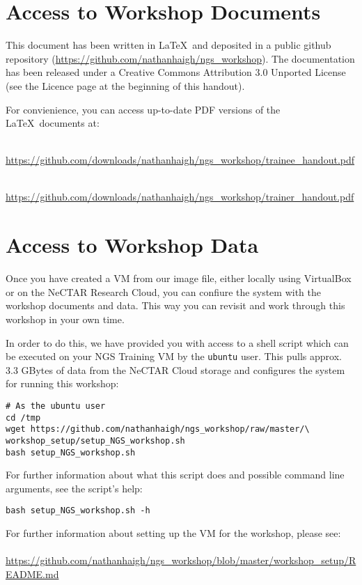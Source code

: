 \section{Access to Workshop Documents}

This document has been written in \LaTeX\ and deposited in a public github
repository (\url{https://github.com/nathanhaigh/ngs_workshop}). The
documentation has been released under a Creative Commons Attribution 3.0
Unported License (see the Licence page at the beginning of this handout).

For convienience, you can access up-to-date PDF versions of the \LaTeX\ documents at:
\begin{description}[style=multiline,labelindent=0cm,align=left,leftmargin=0.5cm]
\item[Trainee Handout]\hfill\\
\url{https://github.com/downloads/nathanhaigh/ngs_workshop/trainee_handout.pdf}
\item[Trainer Handout]\hfill\\
\url{https://github.com/downloads/nathanhaigh/ngs_workshop/trainer_handout.pdf}
\end{description}

\section{Access to Workshop Data}
Once you have created a VM from our image file, either locally using VirtualBox
or on the NeCTAR Research Cloud, you can confiure the system with the workshop
documents and data. This way you can revisit and work through this workshop in
your own time.

In order to do this, we have provided you with access to a shell script which
can be executed on your NGS Training VM by the \texttt{ubuntu} user. This pulls
approx. 3.3 GBytes of data from the NeCTAR Cloud storage and configures the system
for running this workshop:

\begin{lstlisting}
# As the ubuntu user
cd /tmp
wget https://github.com/nathanhaigh/ngs_workshop/raw/master/\
workshop_setup/setup_NGS_workshop.sh
bash setup_NGS_workshop.sh
\end{lstlisting}

For further information about what this script does and possible command line
arguments, see the script's help:
\begin{lstlisting}
bash setup_NGS_workshop.sh -h
\end{lstlisting}


For further information about setting up the VM for the workshop, please see:
\\\\
\url{https://github.com/nathanhaigh/ngs_workshop/blob/master/workshop_setup/README.md}
